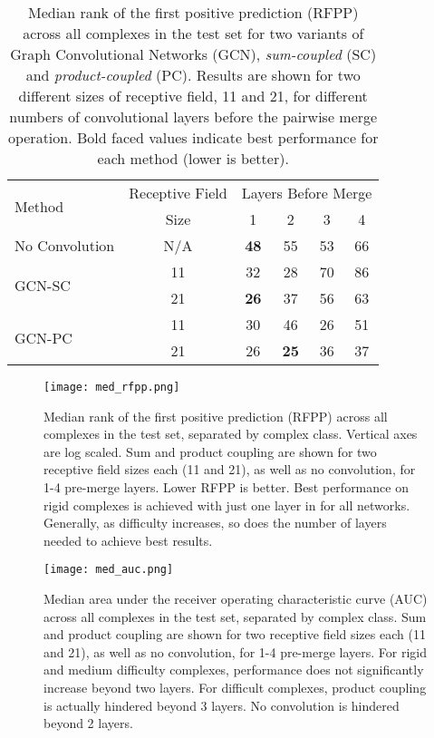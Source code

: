 \begin{table}
	\begin{center}
		\begin{tabular}{lccccc}
			\toprule
			\multirow{2}{*}{Method} &
			Receptive Field & \multicolumn{4}{c}{Layers Before Merge} \\
			& Size & 1 & {2} & {3} & {4} \\
			\midrule
			No Convolution & N/A & \textbf{48} & 55 & 53 & 66 \\\cline{1-6}
			\multirow{2}{*}{GCN-SC} & 11 & 32 & 28 & 70 & 86 \\
			& 21 & \textbf{26} & 37 & 56 & 63 \\\cline{1-6}
			\multirow{2}{*}{GCN-PC} & 11 & 30 & 46 & 26 & 51 \\
			& 21 & 26 & \textbf{25} & 36 & 37 \\
			\bottomrule
		\end{tabular}
		\caption{\small Median rank of the first positive prediction (RFPP) across all complexes in the test set for two variants of Graph Convolutional Networks (GCN), \textit{sum-coupled} (SC) and \textit{product-coupled} (PC). Results are shown for two different sizes of receptive field, 11 and 21, for different numbers of convolutional layers before the pairwise merge operation. Bold faced values indicate best performance for each method (lower is better).}
		\label{tab:med_rfpp}
	\end{center}
\end{table}

\begin{figure}
	\texttt{[image: med\_rfpp.png]}
	\caption{Median rank of the first positive prediction (RFPP) across all complexes in the test set, separated by complex class. Vertical axes are log scaled. Sum and product coupling are shown for two receptive field sizes each (11 and 21), as well as no convolution, for 1-4 pre-merge layers. Lower RFPP is better. Best performance on rigid complexes is achieved with just one layer in for all networks. Generally, as difficulty increases, so does the number of layers needed to achieve best results.
		\label{fig:med_rfpp}}
\end{figure}

\begin{figure}
	\texttt{[image: med\_auc.png]}
	\caption{Median area under the receiver operating characteristic curve (AUC) across all complexes in the test set, separated by complex class. Sum and product coupling are shown for two receptive field sizes each (11 and 21), as well as no convolution, for 1-4 pre-merge layers. For rigid and medium difficulty complexes, performance does not significantly increase beyond two layers. For difficult complexes, product coupling is actually hindered beyond 3 layers. No convolution is hindered beyond 2 layers. 
		\label{fig:med_rfpp}}
\end{figure}

